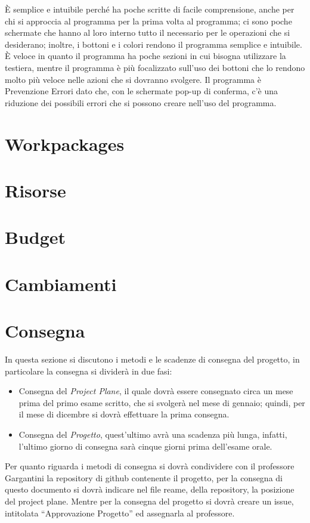\documentclass{book}
\begin{document}
È semplice e intuibile perché ha poche scritte di facile comprensione, anche per chi si approccia al programma per la prima volta al programma; ci sono poche schermate che hanno al loro interno tutto il necessario per le operazioni che si desiderano; inoltre, i bottoni e i colori rendono il programma semplice e intuibile. È veloce in quanto il programma ha poche sezioni in cui bisogna utilizzare la testiera, mentre il programma è più focalizzato sull'uso dei bottoni che lo rendono molto più veloce nelle azioni che si dovranno svolgere. Il programma è Prevenzione Errori dato che, con le schermate pop-up di conferma, c'è una riduzione dei possibili errori che si possono creare nell'uso del programma.


\section{Workpackages}

\section{Risorse}

\section{Budget}

\section{Cambiamenti}


\section{Consegna}

In questa sezione si discutono i metodi e le scadenze di consegna del progetto, in particolare la consegna si dividerà in due fasi:


\begin{itemize}
    \item Consegna del \textit{Project Plane}, il quale dovrà essere consegnato circa un mese prima del primo esame scritto, che si svolgerà nel mese di gennaio; quindi, per il mese di dicembre si dovrà effettuare la prima consegna.
    \item Consegna del \textit{Progetto}, quest'ultimo avrà una scadenza più lunga, infatti, l'ultimo giorno di consegna sarà cinque giorni prima dell'esame orale.
\end{itemize}
Per quanto riguarda i metodi di consegna si dovrà condividere con il professore Gargantini la repository di github contenente il progetto, per la consegna di questo documento si dovrà indicare nel file reame, della repository, la posizione del project plane. Mentre per la consegna del progetto si dovrà creare un issue, intitolata “Approvazione Progetto” ed assegnarla al professore.
\end{document}
